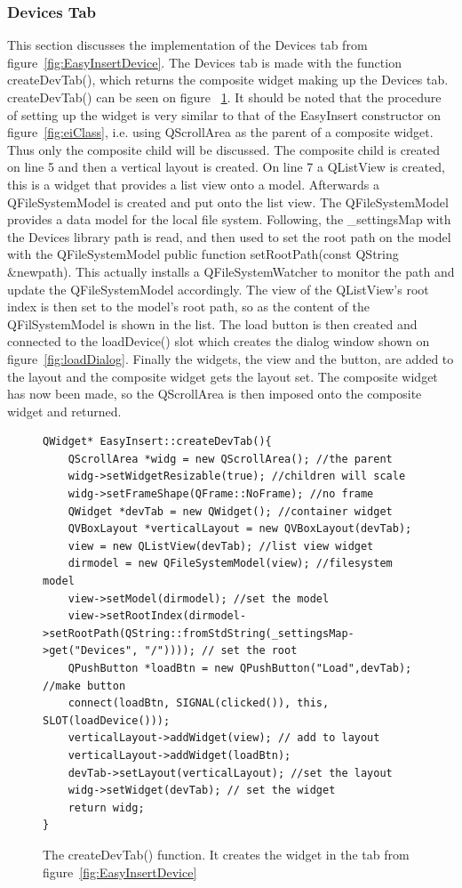 \subsubsection{Devices Tab}
\label{sec:DeviceTab}
This section discusses the implementation of the Devices tab from figure~\ref{fig:EasyInsertDevice}. The Devices tab is made with the function createDevTab(), which returns the composite widget making up the Devices tab. createDevTab() can be seen on figure ~\ref{fig:deviceTabCode}.
It should be noted that the procedure of setting up the widget is very similar to that of the EasyInsert constructor on figure~\ref{fig:eiClass}, i.e. using QScrollArea as the parent of a composite widget. Thus only the composite child will be discussed.  The composite child is created on line 5 and then a vertical layout is created. On line 7 a QListView is created, this is a widget that provides a list view onto a model. Afterwards a QFileSystemModel is created and put onto the list view. The QFileSystemModel provides a data model for the local file system. Following, the \_settingsMap with the Devices library path is read, and then used to set the root path on the model with the QFileSystemModel public function setRootPath(const QString \&newpath). This actually installs a QFileSystemWatcher to monitor the path and update the QFileSystemModel accordingly. The view of the QListView's root index is then set to the model's root path, so as the content of the QFilSystemModel is shown in the list. The load button is then created and connected to the loadDevice() slot which creates the dialog window shown on figure~\ref{fig:loadDialog}. Finally the widgets, the view and the button, are added to the layout and the composite widget gets the layout set. The composite widget has now been made, so the QScrollArea is then imposed onto the composite widget and returned. 

\begin{figure}[h] %
\centering
\lstset{language=C++} 
\begin{lstlisting}[frame=single]  
QWidget* EasyInsert::createDevTab(){
	QScrollArea *widg = new QScrollArea(); //the parent 
	widg->setWidgetResizable(true); //children will scale 
	widg->setFrameShape(QFrame::NoFrame); //no frame 
	QWidget *devTab = new QWidget(); //container widget
	QVBoxLayout *verticalLayout = new QVBoxLayout(devTab); 
	view = new QListView(devTab); //list view widget
	dirmodel = new QFileSystemModel(view); //filesystem model
	view->setModel(dirmodel); //set the model
	view->setRootIndex(dirmodel->setRootPath(QString::fromStdString(_settingsMap->get("Devices", "/")))); // set the root
	QPushButton *loadBtn = new QPushButton("Load",devTab); //make button
	connect(loadBtn, SIGNAL(clicked()), this, SLOT(loadDevice())); 
	verticalLayout->addWidget(view); // add to layout
	verticalLayout->addWidget(loadBtn);
	devTab->setLayout(verticalLayout); //set the layout
	widg->setWidget(devTab); // set the widget
	return widg;
}
\end{lstlisting}
\caption{The createDevTab() function. It creates the widget in the tab from figure~\ref{fig:EasyInsertDevice}}
\label{fig:deviceTabCode} 	
\end{figure}

